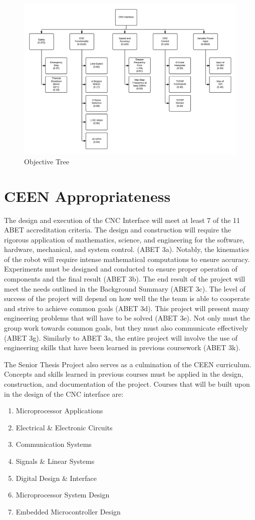 \begin{figure}[H]
\centering
\includegraphics[width=1.0\textwidth]{otree.png}
\caption{Objective Tree}
\label{fig:o-tree}
\end{figure} 

\section{CEEN Appropriateness}
The design and execution of the CNC Interface will meet at least 7 of the 11 ABET accreditation criteria.
The design and construction will require the rigorous application of mathematics, science, and engineering for the software, hardware, mechanical, and system control. (ABET 3a).
Notably, the kinematics of the robot will require intense mathematical computations to ensure accuracy.
Experiments must be designed and conducted to ensure proper operation of components and the final result (ABET 3b).
The end result of the project will meet the needs outlined in the Background Summary (ABET 3c).
The level of success of the project will depend on how well the the team is able to cooperate and strive to achieve common goals (ABET 3d).
This project will present many engineering problems that will have to be solved (ABET 3e).
Not only must the group work towards common goals, but they must also communicate effectively (ABET 3g).
Similarly to ABET 3a, the entire project will involve the use of engineering skills that have been learned in previous coursework (ABET 3k).

The Senior Thesis Project also serves as a culmination of the CEEN curriculum. Concepts and skills learned in previous courses must be applied in the design, construction, and documentation of the project.
Courses that will be built upon in the design of the CNC interface are:
\begin{enumerate} \parskip2pt
	\item Microprocessor Applications
	\item Electrical \& Electronic Circuits
	\item Communication Systems
	\item Signals \& Linear Systems
	\item Digital Design \& Interface
	\item Microprocessor System Design
	\item Embedded Microcontroller Design
\end{enumerate}
